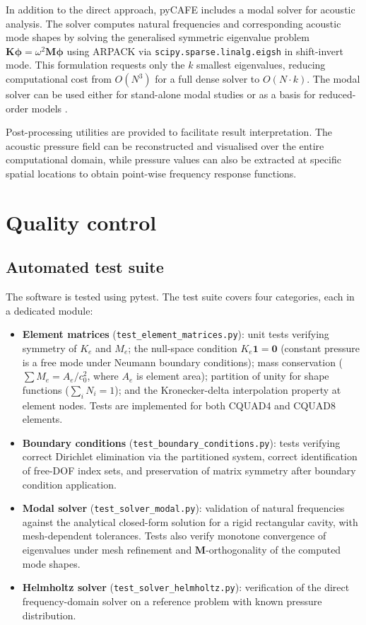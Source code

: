 \documentclass{jors}
\begin{document}
In addition to the direct approach, pyCAFE includes a modal solver for acoustic analysis. The solver computes natural frequencies and corresponding acoustic mode shapes by solving the generalised symmetric eigenvalue problem $\mathbf{K}\boldsymbol{\phi} = \omega^2 \mathbf{M}\boldsymbol{\phi}$ using ARPACK via \texttt{scipy.sparse.linalg.eigsh} in shift-invert mode. This formulation requests only the $k$ smallest eigenvalues, reducing computational cost from $O(N^3)$ for a full dense solver to $O(N \cdot k)$. The modal solver can be used either for stand-alone modal studies or as a basis for reduced-order models \cite{Cai2024}.

Post-processing utilities are provided to facilitate result interpretation. The acoustic pressure field can be reconstructed and visualised over the entire computational domain, while pressure values can also be extracted at specific spatial locations to obtain point-wise frequency response functions.

\section*{Quality control}

\subsection*{Automated test suite}

The software is tested using pytest. The test suite covers four categories, each in a dedicated module:

\begin{itemize}
    \item \textbf{Element matrices} (\texttt{test\_element\_matrices.py}): unit tests verifying symmetry of $K_e$ and $M_e$; the null-space condition $K_e \mathbf{1} = \mathbf{0}$ (constant pressure is a free mode under Neumann boundary conditions); mass conservation ($\sum M_e = A_e / c_0^2$, where $A_e$ is element area); partition of unity for shape functions ($\sum_i N_i = 1$); and the Kronecker-delta interpolation property at element nodes. Tests are implemented for both CQUAD4 and CQUAD8 elements.
    \item \textbf{Boundary conditions} (\texttt{test\_boundary\_conditions.py}): tests verifying correct Dirichlet elimination via the partitioned system, correct identification of free-DOF index sets, and preservation of matrix symmetry after boundary condition application.
    \item \textbf{Modal solver} (\texttt{test\_solver\_modal.py}): validation of natural frequencies against the analytical closed-form solution for a rigid rectangular cavity, with mesh-dependent tolerances. Tests also verify monotone convergence of eigenvalues under mesh refinement and $\mathbf{M}$-orthogonality of the computed mode shapes.
    \item \textbf{Helmholtz solver} (\texttt{test\_solver\_helmholtz.py}): verification of the direct frequency-domain solver on a reference problem with known pressure distribution.
\end{itemize}
\end{document}
